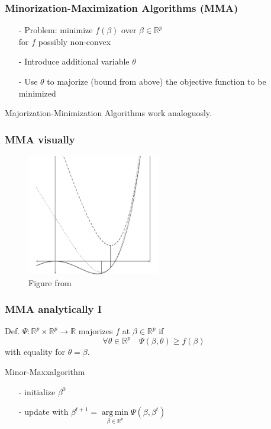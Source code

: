 \documentclass{beamer}
\newcommand{\R}{\mathbb{R}}
\DeclareMathOperator*{\argmin}{arg\,min}
\begin{document}
\begin{frame}
\frametitle{Minorization-Maximization Algorithms (MMA)}
\begin{itemize}
\item[-] Problem: minimize $f(\beta)$ over $\beta\in\R^p$\\ for $f$ possibly non-convex
\item[-] Introduce additional variable $\theta$
\item[-] Use $\theta$ to majorize (bound from above) the objective function to be minimized
\end{itemize}


{\small Majorization-Minimization Algorithms work analoguosly.}
\end{frame}

\begin{frame}
\frametitle{MMA visually}
\begin{figure}
\includegraphics[height=150pt]{img/minmaxalgo2.png}
\caption{Figure from \cite{DL15}}
\end{figure}

\end{frame}

\begin{frame}
\frametitle{MMA analytically I}
Def. 
$\Psi:\R^p\times\R^p\to\R$ {\color{blue}majorizes} $f$ at $\beta\in\R^p$ if \[\forall\theta\in\R^p\quad \Psi(\beta,\theta)\ge f(\beta)\]
with equality for $\theta=\beta$.
\vspace{10pt}

Minor-Maxxalgorithm
\begin{itemize}
\item[-] initialize $\beta^0$
\item[-] update with $\beta^{t+1}=\argmin\limits_{\beta\in\R^p}\Psi(\beta,\beta^t)$
\end{itemize}
\end{frame}
\end{document}
